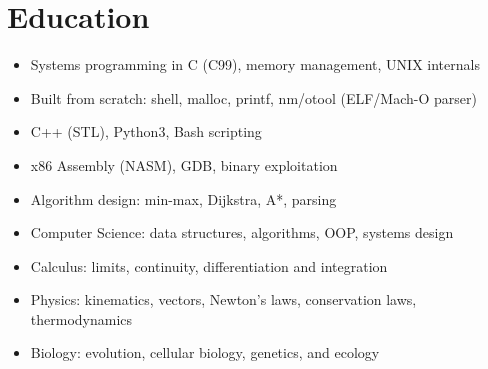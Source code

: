 \section{Education}

\begin{minipage}{.15\textwidth}
    \centerline{}
\end{minipage}%
\hspace{5mm}
\begin{minipage}{.9\textwidth}
    \raggedright
    \begin{minipage}[t]{.8\textwidth}
        \begin{itemize}
            \item Systems programming in C (C99), memory management, UNIX internals
            \item Built from scratch: shell, malloc, printf, nm/otool (ELF/Mach-O parser)
            \item C++ (STL), Python3, Bash scripting
            \item x86 Assembly (NASM), GDB, binary exploitation
            \item Algorithm design: min-max, Dijkstra, A*, parsing
        \end{itemize}
    \end{minipage}
\end{minipage}
\begin{minipage}{.15\textwidth}
    \centerline{}
\end{minipage}%
\hspace{5mm}
\begin{minipage}{.9\textwidth}
    \raggedright
    \begin{minipage}[t]{.8\textwidth}
        \begin{itemize}
            \item Computer Science: data structures, algorithms, OOP, systems design
            \item Calculus: limits, continuity, differentiation and integration
            \item Physics: kinematics, vectors, Newton's laws, conservation laws, thermodynamics
            \item Biology: evolution, cellular biology, genetics, and ecology
        \end{itemize}
    \end{minipage}
\end{minipage}
